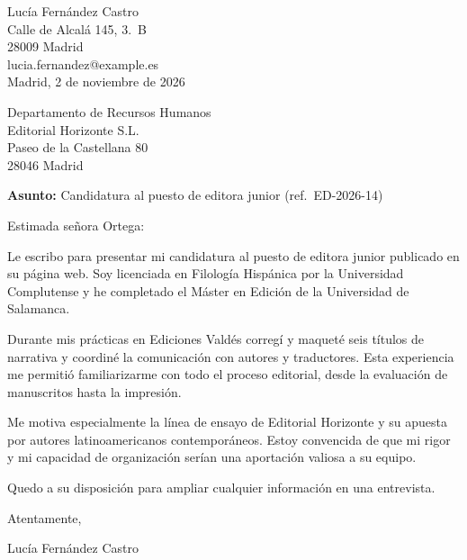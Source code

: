 \documentclass[11pt,a4paper]{article}
\begin{document}
\begin{flushright}
Lucía Fernández Castro\\
Calle de Alcalá 145, 3.\textordmasculine\ B\\
28009 Madrid\\
lucia.fernandez@example.es\\[12pt]
Madrid, 2 de noviembre de 2026
\end{flushright}

Departamento de Recursos Humanos\\
Editorial Horizonte S.L.\\
Paseo de la Castellana 80\\
28046 Madrid

\textbf{Asunto:} Candidatura al puesto de editora junior (ref.\ ED-2026-14)

Estimada señora Ortega:

Le escribo para presentar mi candidatura al puesto de editora junior publicado en su
página web. Soy licenciada en Filología Hispánica por la Universidad Complutense y he
completado el Máster en Edición de la Universidad de Salamanca.

Durante mis prácticas en Ediciones Valdés corregí y maqueté seis títulos de narrativa y
coordiné la comunicación con autores y traductores. Esta experiencia me permitió
familiarizarme con todo el proceso editorial, desde la evaluación de manuscritos hasta la
impresión.

Me motiva especialmente la línea de ensayo de Editorial Horizonte y su apuesta por autores
latinoamericanos contemporáneos. Estoy convencida de que mi rigor y mi capacidad de
organización serían una aportación valiosa a su equipo.

Quedo a su disposición para ampliar cualquier información en una entrevista.

Atentamente,

\vspace{1.5cm}
Lucía Fernández Castro
\end{document}
